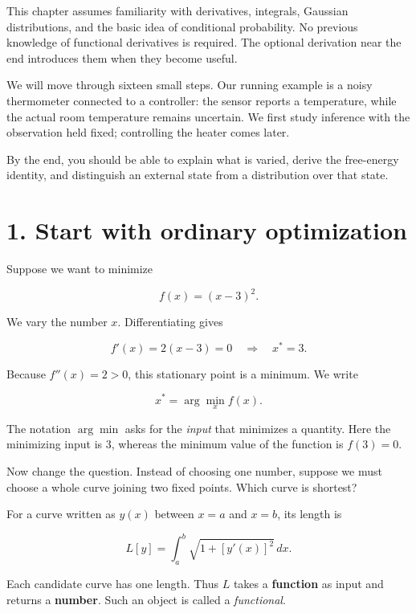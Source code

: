\documentclass[
  letterpaper,
  DIV=11,
  numbers=noendperiod]{scrreprt}
\begin{document}
This chapter assumes familiarity with derivatives, integrals, Gaussian
distributions, and the basic idea of conditional probability. No
previous knowledge of functional derivatives is required. The optional
derivation near the end introduces them when they become useful.

We will move through sixteen small steps. Our running example is a noisy
thermometer connected to a controller: the sensor reports a temperature,
while the actual room temperature remains uncertain. We first study
inference with the observation held fixed; controlling the heater comes
later.

By the end, you should be able to explain what is varied, derive the
free-energy identity, and distinguish an external state from a
distribution over that state.

\section{1. Start with ordinary
optimization}\label{start-with-ordinary-optimization}

Suppose we want to minimize

\[
f(x)=(x-3)^2.
\]

We vary the number \(x\). Differentiating gives

\[
f'(x)=2(x-3)=0
\quad\Longrightarrow\quad x^*=3.
\]

Because \(f''(x)=2>0\), this stationary point is a minimum. We write

\[
x^*=\arg\min_x f(x).
\]

The notation \(\arg\min\) asks for the \emph{input} that minimizes a
quantity. Here the minimizing input is \(3\), whereas the minimum value
of the function is \(f(3)=0\).

Now change the question. Instead of choosing one number, suppose we must
choose a whole curve joining two fixed points. Which curve is shortest?

For a curve written as \(y(x)\) between \(x=a\) and \(x=b\), its length
is

\[
L[y]=\int_a^b \sqrt{1+[y'(x)]^2}\,dx.
\]

Each candidate curve has one length. Thus \(L\) takes a
\textbf{function} as input and returns a \textbf{number}. Such an object
is called a \emph{functional}.
\end{document}

